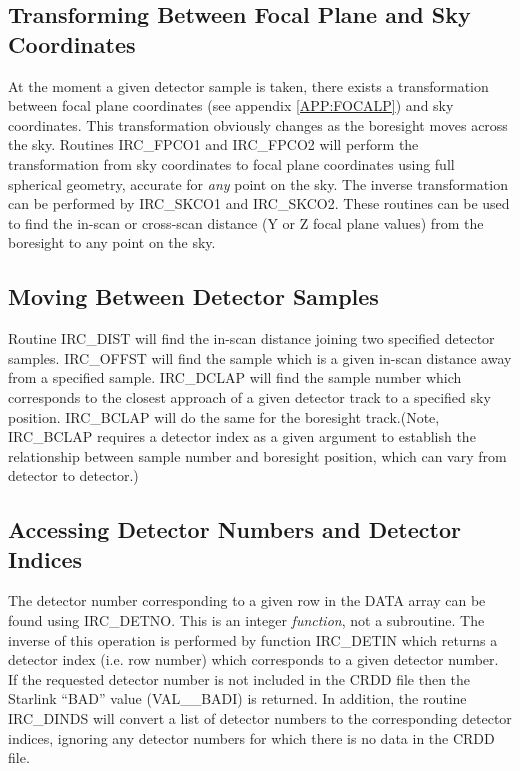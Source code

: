 \subsection {Transforming Between Focal Plane and Sky Coordinates}
At the moment a given detector sample is taken, there exists a transformation
between focal plane coordinates (see appendix \ref {APP:FOCALP}) and sky
coordinates. This transformation obviously changes as the boresight moves across
the sky. Routines IRC\_FPCO1 and IRC\_FPCO2 will perform the transformation from
sky coordinates to focal plane coordinates using full spherical geometry,
accurate for {\em any} point on the sky. The inverse transformation can be
performed by IRC\_SKCO1 and IRC\_SKCO2. These routines can be used to find the
in-scan or cross-scan distance (Y or Z focal plane values) from the boresight to
any point on the sky.

\subsection {Moving Between Detector Samples}
Routine IRC\_DIST will find the in-scan distance joining two specified detector
samples. IRC\_OFFST will find the sample which is a given in-scan distance away
from a specified sample. IRC\_DCLAP will find the sample number which
corresponds to the closest approach of a given detector track to a specified sky
position. IRC\_BCLAP will do the same for the boresight track.(Note, IRC\_BCLAP
requires a detector index as a given argument to establish the relationship
between sample number and boresight position, which can vary from detector to
detector.)

\subsection {Accessing Detector Numbers and Detector Indices}
The detector number corresponding to a given row in the DATA array can be found
using IRC\_DETNO. This is an integer {\em function}, not a subroutine. The
inverse of this operation is performed by function IRC\_DETIN which returns a
detector index (i.e. row number) which corresponds to a given detector number.
If the requested detector number is not included in the CRDD file then the
Starlink ``BAD'' value (VAL\_\_BADI) is returned. In addition, the routine
IRC\_DINDS will convert a list of detector numbers to the corresponding detector
indices, ignoring any detector numbers for which there is no data in the CRDD
file.

